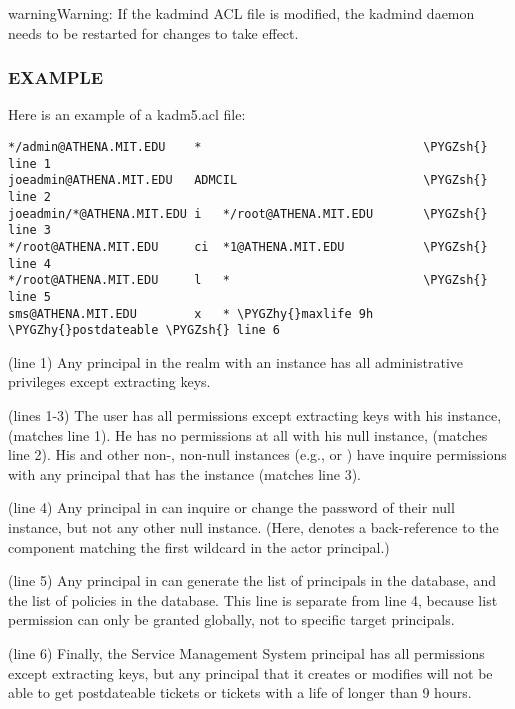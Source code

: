 \documentclass[letterpaper,10pt,english]{sphinxmanual}
\def\PYGZsh{\char`\#}
\def\PYGZhy{\char`\-}
\begin{document}
\begin{notice}{warning}{Warning:}
If the kadmind ACL file is modified, the kadmind daemon needs to be
restarted for changes to take effect.
\end{notice}


\subsubsection{EXAMPLE}
\label{admin/conf_files/kadm5_acl:example}
Here is an example of a kadm5.acl file:

\begin{Verbatim}[commandchars=\\\{\}]
*/admin@ATHENA.MIT.EDU    *                               \PYGZsh{} line 1
joeadmin@ATHENA.MIT.EDU   ADMCIL                          \PYGZsh{} line 2
joeadmin/*@ATHENA.MIT.EDU i   */root@ATHENA.MIT.EDU       \PYGZsh{} line 3
*/root@ATHENA.MIT.EDU     ci  *1@ATHENA.MIT.EDU           \PYGZsh{} line 4
*/root@ATHENA.MIT.EDU     l   *                           \PYGZsh{} line 5
sms@ATHENA.MIT.EDU        x   * \PYGZhy{}maxlife 9h \PYGZhy{}postdateable \PYGZsh{} line 6
\end{Verbatim}

(line 1) Any principal in the  realm with an
 instance has all administrative privileges except extracting
keys.

(lines 1-3) The user  has all permissions except
extracting keys with his  instance,
 (matches line 1).  He has no
permissions at all with his null instance, 
(matches line 2).  His  and other non-, non-null
instances (e.g.,  or ) have inquire permissions
with any principal that has the instance  (matches line 3).

(line 4) Any  principal in  can inquire
or change the password of their null instance, but not any other
null instance.  (Here,  denotes a back-reference to the
component matching the first wildcard in the actor principal.)

(line 5) Any  principal in  can generate
the list of principals in the database, and the list of policies
in the database.  This line is separate from line 4, because list
permission can only be granted globally, not to specific target
principals.

(line 6) Finally, the Service Management System principal
 has all permissions except extracting keys, but
any principal that it creates or modifies will not be able to get
postdateable tickets or tickets with a life of longer than 9 hours.
\end{document}
